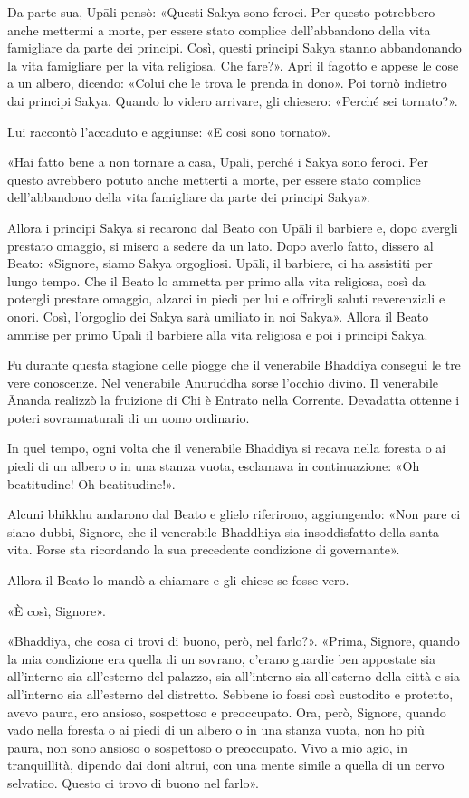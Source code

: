 Da parte sua, Upāli pensò: «Questi Sakya sono feroci. Per questo
potrebbero anche mettermi a morte, per essere stato complice
dell’abbandono della vita famigliare da parte dei principi. Così, questi
principi Sakya stanno abbandonando la vita famigliare per la vita
religiosa. Che fare?». Aprì il fagotto e appese le cose a un albero,
dicendo: «Colui che le trova le prenda in dono». Poi tornò indietro dai
principi Sakya. Quando lo videro arrivare, gli chiesero: «Perché sei
tornato?».


Lui raccontò l’accaduto e aggiunse: «E così sono tornato».


«Hai fatto bene a non tornare a casa, Upāli, perché i Sakya sono feroci.
Per questo avrebbero potuto anche metterti a morte, per essere stato
complice dell’abbandono della vita famigliare da parte dei principi
Sakya».


Allora i principi Sakya si recarono dal Beato con Upāli il barbiere e,
dopo avergli prestato omaggio, si misero a sedere da un lato. Dopo
averlo fatto, dissero al Beato: «Signore, siamo Sakya orgogliosi. Upāli,
il barbiere, ci ha assistiti per lungo tempo. Che il Beato lo ammetta
per primo alla vita religiosa, così da potergli prestare omaggio,
alzarci in piedi per lui e offrirgli saluti reverenziali e onori. Così,
l’orgoglio dei Sakya sarà umiliato in noi Sakya». Allora il Beato ammise
per primo Upāli il barbiere alla vita religiosa e poi i principi Sakya.


Fu durante questa stagione delle piogge che il venerabile Bhaddiya
conseguì le tre vere conoscenze. Nel venerabile Anuruddha sorse l’occhio
divino. Il venerabile Ānanda realizzò la fruizione di Chi è Entrato
nella Corrente. Devadatta ottenne i poteri sovrannaturali di un uomo
ordinario.


In quel tempo, ogni volta che il venerabile Bhaddiya si recava nella
foresta o ai piedi di un albero o in una stanza vuota, esclamava in
continuazione: «Oh beatitudine! Oh beatitudine!».


Alcuni bhikkhu andarono dal Beato e glielo riferirono, aggiungendo: «Non
pare ci siano dubbi, Signore, che il venerabile Bhaddhiya sia
insoddisfatto della santa vita. Forse sta ricordando la sua precedente
condizione di governante».


Allora il Beato lo mandò a chiamare e gli chiese se fosse vero.


«È così, Signore».


«Bhaddiya, che cosa ci trovi di buono, però, nel farlo?». «Prima,
Signore, quando la mia condizione era quella di un sovrano, c’erano
guardie ben appostate sia all’interno sia all’esterno del palazzo, sia
all’interno sia all’esterno della città e sia all’interno sia
all’esterno del distretto. Sebbene io fossi così custodito e protetto,
avevo paura, ero ansioso, sospettoso e preoccupato. Ora, però, Signore,
quando vado nella foresta o ai piedi di un albero o in una stanza vuota,
non ho più paura, non sono ansioso o sospettoso o preoccupato. Vivo a
mio agio, in tranquillità, dipendo dai doni altrui, con una mente simile
a quella di un cervo selvatico. Questo ci trovo di buono nel farlo».


